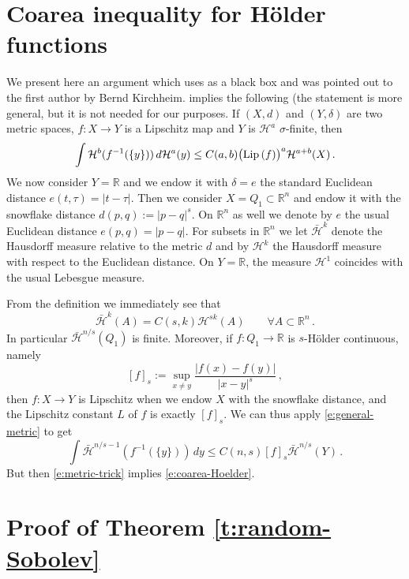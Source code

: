 \documentclass[11pt,reqno]{amsart}
\newcommand{\R}{\mathbb R}
\theoremstyle{definition}
\numberwithin{equation}{section}
\begin{document}
\appendix

\section{Coarea inequality for H\"older functions}\label{a:coarea}

We present here an argument which uses \cite[Theorem 2.10.25]{Federer} as a black box and was pointed out to the first author by Bernd Kirchheim. \cite[Theorem 2.10.25]{Federer} implies the following (the statement is more general, but it is not needed for our purposes. If $(X,d)$ and $(Y, \delta)$ are two metric spaces, $f:X\to Y$ is a Lipschitz map and $Y$ is $\mathcal{H}^a$ $\sigma$-finite, then
\begin{equation}\label{e:general-metric}
\int \mathcal{H}^b (f^{-1} (\{y\}))\, d\mathcal{H}^a (y) \leq C (a,b) \bigl({\rm Lip\,} (f)\bigr)^a \mathcal{H}^{a+b} (X)\, .
\end{equation}
We now consider $Y= \mathbb R$ and we endow it with $\delta=e$ the standard Euclidean distance $e(t,\tau)=|t-\tau|$. Then we consider $X=Q_1\subset \mathbb R^n$ and endow it with the snowflake distance $d (p,q) := |p-q|^s$. On $\mathbb R^n$ as well we denote by $e$ the usual Euclidean distance $e(p,q)=|p-q|$. For subsets in $\mathbb R^n$ we let $\bar{\mathcal{H}}^k$ denote the Hausdorff measure relative to the metric $d$ and by $\mathcal{H}^k$ the Hausdorff measure with respect to the Euclidean distance. On $Y=\R$, the measure $\mathcal{H}^1$ coincides with the usual Lebesgue measure. 

From the definition we immediately see that 
\begin{equation}\label{e:metric-trick}
    \bar{\mathcal{H}}^k (A) = C (s, k) \mathcal{H}^{s k} (A) \qquad \forall A\subset \mathbb R^n\, .
\end{equation} 
In particular $\bar{\mathcal{H}}^{n/s} (Q_1)$ is finite. Moreover, if $f: Q_1 \to \mathbb R$ is $s$-H\"older continuous,
namely
\[
[f]_s := \sup_{x\neq y} \frac{|f(x)-f(y)|}{|x-y|^s}\, ,
\]
then $f: X \to Y$ is Lipschitz when we endow $X$ with the snowflake distance, and the Lipschitz constant $L$ of $f$ is exactly $[f]_s$. We can thus apply \eqref{e:general-metric} to get 
\[
\int \bar{\mathcal{H}}^{n/s -1} (f^{-1} (\{y\}))\, dy \leq C (n, s) [f]_s \bar{\mathcal{H}}^{n/s} (Y)\, .
\]
But then \eqref{e:metric-trick} implies \eqref{e:coarea-Hoelder}. 

\section{Proof of Theorem \texorpdfstring{\ref{t:random-Sobolev}}{random}}\label{a:random}
\end{document}

